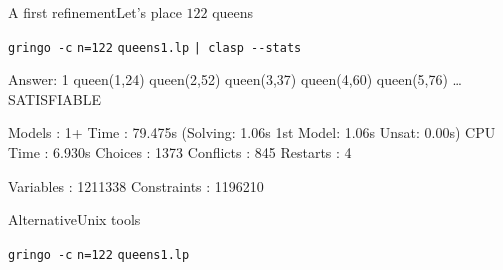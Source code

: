\begin{frame}[fragile]{A first refinement}{Let's place \alert{$122$} queens}
\begin{block}{\alert<1>{\lstinline{gringo -c} \alert{\lstinline{n=122}} \lstinline{queens1.lp} \lstinline{| clasp --stats}}}
\pause\footnotesize%
\begin{semiverbatim}
Answer: 1
queen(1,24) queen(2,52) queen(3,37) queen(4,60) queen(5,76) \dots{}
SATISFIABLE

Models      : 1+
\alert<2>{Time        : 79.475s} (\alert<2>{Solving: 1.06s} 1st Model: 1.06s Unsat: 0.00s)
CPU Time    : 6.930s
\alert<2>{Choices     : 1373}
\alert<2>{Conflicts   : 845}
Restarts    : 4

\alert<3>{Variables   : 1211338}
\alert<3>{Constraints : 1196210}
\end{semiverbatim}
\end{block}
\end{frame}
\begin{frame}[fragile]{Alternative}{Unix tools}
\begin{block}{\alert{\lstinline{gringo -c} \alert{\lstinline{n=122}} \lstinline{queens1.lp}} }
\footnotesize%
\end{block}
\end{frame}
